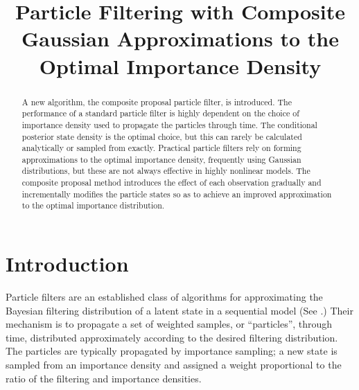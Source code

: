 \documentclass[conference]{IEEEtran}
\begin{document}
\title{Particle Filtering with Composite Gaussian Approximations to the Optimal Importance Density}
\author{
\and
{}
}

\maketitle

\begin{abstract}
A new algorithm, the composite proposal particle filter, is introduced. The performance of a standard particle filter is highly dependent on the choice of importance density used to propagate the particles through time. The conditional posterior state density is the optimal choice, but this can rarely be calculated analytically or sampled from exactly. Practical particle filters rely on forming approximations to the optimal importance density, frequently using Gaussian distributions, but these are not always effective in highly nonlinear models. The composite proposal method introduces the effect of each observation gradually and incrementally modifies the particle states so as to achieve an improved approximation to the optimal importance distribution.
\end{abstract}


\IEEEpeerreviewmaketitle



\section{Introduction}

Particle filters are an established class of algorithms for approximating the Bayesian filtering distribution of a latent state in a sequential model (See \cite{Cappe2007,Doucet2009}.) Their mechanism is to propagate a set of weighted samples, or ``particles'', through time, distributed approximately according to the desired filtering distribution. The particles are typically propagated by importance sampling; a new state is sampled from an importance density and assigned a weight proportional to the ratio of the filtering and importance densities.
\end{document}
